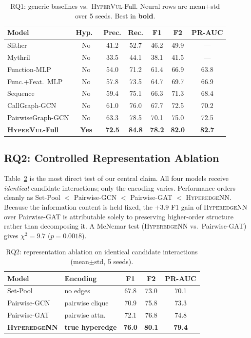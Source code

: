 \documentclass[conference]{IEEEtran}
\newcommand{\hypervul}{\textsc{HyperVul}}
\newcommand{\hyperedgenn}{\textsc{HyperedgeNN}}
\begin{document}
\begin{table}[t]
\caption{RQ1: generic baselines vs.\ \hypervul{}-Full. Neural rows are
mean$\pm$std over 5 seeds. Best in \textbf{bold}.}
\label{tab:rq1}
\centering
\setlength{\tabcolsep}{2.6pt}
\renewcommand{\arraystretch}{1.12}
\begin{tabular}{lcccccc}
\toprule
Model & Hyp.\ & Prec. & Rec. & F1 & F2 & PR-AUC \\
\midrule
Slither            & No & 41.2 & 52.7 & 46.2 & 49.9 & --- \\
Mythril            & No & 33.5 & 44.1 & 38.1 & 41.5 & --- \\
Function-MLP       & No & 54.0 & 71.2 & 61.4 & 66.9 & 63.8 \\
Func.+Feat.\ MLP   & No & 57.8 & 73.5 & 64.7 & 69.7 & 66.9 \\
Sequence           & No & 59.4 & 75.1 & 66.3 & 71.3 & 68.4 \\
CallGraph-GCN      & No & 61.0 & 76.0 & 67.7 & 72.5 & 70.2 \\
PairwiseGraph-GCN  & No & 63.3 & 78.5 & 70.1 & 75.0 & 72.5 \\
\textbf{\hypervul{}-Full} & \textbf{Yes} & \textbf{72.5} & \textbf{84.8}
  & \textbf{78.2} & \textbf{82.0} & \textbf{82.7} \\
\bottomrule
\end{tabular}
\end{table}

\subsection{RQ2: Controlled Representation Ablation}
Table~\ref{tab:rq2} is the most direct test of our central claim. All four models
receive \emph{identical} candidate interactions; only the encoding varies. Performance
orders cleanly as Set-Pool $<$ Pairwise-GCN $<$ Pairwise-GAT $<$ \hyperedgenn{}.
Because the information content is held fixed, the $+3.9$ F1 gain of \hyperedgenn{}
over Pairwise-GAT is attributable solely to preserving higher-order structure rather
than decomposing it. A McNemar test (\hyperedgenn{} vs.\ Pairwise-GAT) gives
$\chi^2{=}9.7$ ($p{=}0.0018$).

\begin{table}[t]
\caption{RQ2: representation ablation on identical candidate interactions
(mean$\pm$std, 5 seeds).}
\label{tab:rq2}
\centering
\setlength{\tabcolsep}{3.0pt}
\renewcommand{\arraystretch}{1.12}
\begin{tabular}{llccc}
\toprule
Model & Encoding & F1 & F2 & PR-AUC \\
\midrule
Set-Pool      & no edges          & 67.8 & 73.0 & 70.1 \\
Pairwise-GCN  & pairwise clique   & 70.9 & 75.8 & 73.3 \\
Pairwise-GAT  & pairwise attn.    & 72.1 & 76.8 & 74.8 \\
\textbf{\hyperedgenn{}} & \textbf{true hyperedge} & \textbf{76.0}
  & \textbf{80.1} & \textbf{79.4} \\
\bottomrule
\end{tabular}
\end{table}
\end{document}
